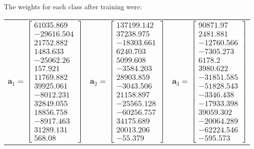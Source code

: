 \documentclass{article}
\newcommand{\mbf}[1]{\ensuremath{\mathbf{#1}}}
\begin{document}
The weights for each class after training were:
\begin{center}
\begin{tabular}{ ccc }
$\mbf{a}_1 = \left[\begin{matrix}
    61035.869 \\ 
    -29616.504 \\ 
    21752.882 \\ 
    1483.633 \\
    -25062.26 \\ 
    157.921 \\ 
    11769.882 \\ 
    39925.061 \\
    -8012.231 \\ 
    32849.055 \\ 
    18856.758 \\ 
    -8917.463 \\
    31289.131 \\ 
    568.08
\end{matrix}\right]$ & 
$\mbf{a}_2 = \left[\begin{matrix}
    137199.142 \\
    37238.975 \\
    -18303.661 \\
    6240.703 \\
    5099.608 \\
    -3584.203 \\
    28903.859 \\
    -3043.506 \\
    21158.897 \\
    -25565.128 \\
    -60256.757 \\
    34175.689 \\
    20013.206 \\
    -55.379 
\end{matrix}\right]$ & 
$\mbf{a}_3 = \left[\begin{matrix}
    90871.97 \\
    2481.881 \\
    -12760.566 \\
    -7305.273 \\
    6178.2 \\
    3980.622 \\
    -31851.585 \\
    -51828.543 \\
    -3346.438 \\
    -17933.398 \\
    39059.302 \\
    -20064.289 \\
    -62224.546 \\
    -595.573
\end{matrix}\right]$
\end{tabular}
\end{center}
\end{document}
